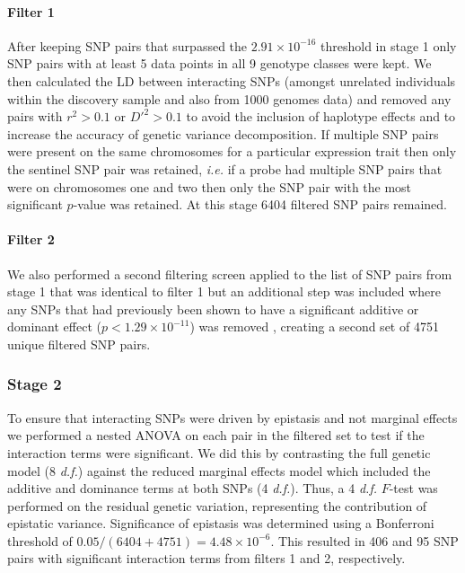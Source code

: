 \documentclass{article}
\begin{document}
\paragraph{Filter 1} After keeping SNP pairs that surpassed the $2.91 \times 10^{-16}$ threshold in stage 1 only SNP pairs with at least 5 data points in all 9 genotype classes were kept. We then calculated the LD between interacting SNPs (amongst unrelated individuals within the discovery sample and also from 1000 genomes data) and removed any pairs with $r^2 > 0.1$ or $D'^{2} > 0.1$ to avoid the inclusion of haplotype effects and to increase the accuracy of genetic variance decomposition. If multiple SNP pairs were present on the same chromosomes for a particular expression trait then only the sentinel SNP pair was retained, \emph{i.e.} if a probe had multiple SNP pairs that were on chromosomes one and two then only the SNP pair with the most significant $p$-value was retained. At this stage 6404 filtered SNP pairs remained. 

\paragraph{Filter 2} We also performed a second filtering screen applied to the list of SNP pairs from stage 1 that was identical to filter 1 but an additional step was included where any SNPs that had previously been shown to have a significant additive or dominant effect ($p < 1.29 \times 10^{-11}$) was removed \cite{Powell2013}, creating a second set of 4751 unique filtered SNP pairs.

\subsubsection{Stage 2}

To ensure that interacting SNPs were driven by epistasis and not marginal effects we performed a nested ANOVA on each pair in the filtered set to test if the interaction terms were significant. We did this by contrasting the full genetic model (8 \emph{d.f.}) against the reduced marginal effects model which included the additive and dominance terms at both SNPs (4 \emph{d.f.}). Thus, a 4 \emph{d.f.} $F$-test was performed on the residual genetic variation, representing the contribution of epistatic variance. Significance of epistasis was determined using a Bonferroni threshold of $0.05 / (6404+4751) = 4.48 \times 10^{-6}$. This resulted in 406 and 95 SNP pairs with significant interaction terms from filters 1 and 2, respectively.
\end{document}
